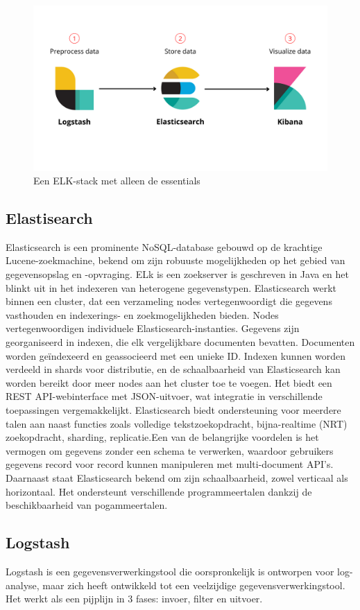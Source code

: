 \begin{figure}[h]
    \centering
    \includegraphics[width=0.5\linewidth]{bachproef//graphics/ELK_stack_essentials.png}
    \caption{Een ELK-stack met alleen de essentials ~\autocite{DavidTaylor}}
    \label{fig:Een ELK-stack met alleen de essentials}
\end{figure}

\subsection{Elastisearch}
Elasticsearch is een prominente NoSQL-database gebouwd op de krachtige Lucene-zoekmachine, bekend om zijn robuuste mogelijkheden op het gebied van gegevensopslag en -opvraging. ELk is een zoekserver is geschreven in Java en het blinkt uit in het indexeren van heterogene gegevenstypen. Elasticsearch werkt binnen een cluster, dat een verzameling nodes vertegenwoordigt die gegevens vasthouden en indexerings- en zoekmogelijkheden bieden. Nodes vertegenwoordigen individuele Elasticsearch-instanties. Gegevens zijn georganiseerd in indexen, die elk vergelijkbare documenten bevatten. Documenten worden geïndexeerd en geassocieerd met een unieke ID. Indexen kunnen worden verdeeld in shards voor distributie, en de schaalbaarheid van Elasticsearch kan worden bereikt door meer nodes aan het cluster toe te voegen. Het biedt een REST API-webinterface met JSON-uitvoer, wat integratie in verschillende toepassingen vergemakkelijkt. Elasticsearch biedt ondersteuning voor meerdere talen aan naast functies zoals volledige tekstzoekopdracht, bijna-realtime (NRT) zoekopdracht, sharding, replicatie.Een van de belangrijke voordelen is het vermogen om gegevens zonder een schema te verwerken, waardoor gebruikers gegevens record voor record kunnen manipuleren met multi-document API's. Daarnaast staat Elasticsearch bekend om zijn schaalbaarheid, zowel verticaal als horizontaal. Het ondersteunt verschillende programmeertalen dankzij de beschikbaarheid van pogammeertalen. ~\autocite{GedalBer}  

\subsection{Logstash}
Logstash is een gegevensverwerkingstool die oorspronkelijk is ontworpen voor log-analyse, maar zich heeft ontwikkeld tot een veelzijdige gegevensverwerkingstool. Het werkt als een pijplijn in 3 fases: invoer, filter en uitvoer.~\autocite{Jamie2017,JugensToit}  

